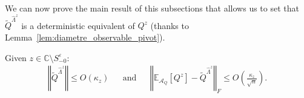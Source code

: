 \documentclass[a4papaer, titlepage]{book}
\begin{document}
We can now prove the main result of this subsections that allows us to set that $\tilde Q^{\hat \Lambda^z}$ is a deterministic equivalent of $Q^z$ (thanks to Lemma~\ref{lem:diametre_observable_pivot}).
\begin{proposition}\label{pro:borne_EQ_m_tQ}
  Given $z\in \mathbb C \setminus S_{-0}^\varepsilon$:
  \begin{align*}
     \left\Vert \tilde Q^{\hat \Lambda^z}\right\Vert \leq O(\kappa_z)&
    &\text{and}&
    &\left\Vert \mathbb{E}_{\mathcal A_Q}[Q^z] - \tilde Q^{\hat \Lambda^z} \right\Vert_F \leq  O \left(\frac{\kappa_z}{\sqrt{n}} \right).
  \end{align*}
\end{proposition} 
\end{document}
